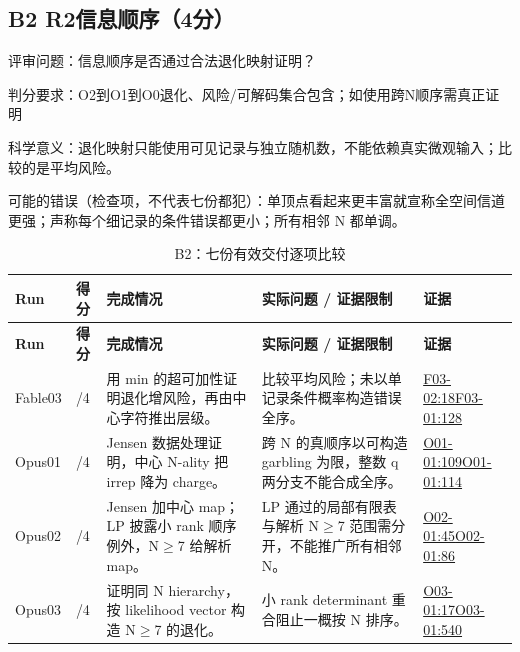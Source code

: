 \documentclass[11pt,a4paper]{article}
\begin{document}
\subsection{B2 R2信息顺序（4分）}
\label{aspect:B2}
评审问题：信息顺序是否通过合法退化映射证明？

判分要求：O2到O1到O0退化、风险/可解码集合包含；如使用跨N顺序需真正证明

科学意义：退化映射只能使用可见记录与独立随机数，不能依赖真实微观输入；比较的是平均风险。

可能的错误（检查项，不代表七份都犯）：单顶点看起来更丰富就宣称全空间信道更强；声称每个细记录的条件错误都更小；所有相邻 N 都单调。

{\fontsize{9.0}{12.6}\selectfont
\setlength{\tabcolsep}{2.5pt}
\begin{longtable}{>{\raggedright\arraybackslash}p{}>{\raggedright\arraybackslash}p{}>{\raggedright\arraybackslash}p{}>{\raggedright\arraybackslash}p{}>{\raggedright\arraybackslash}p{}}
\caption{B2：七份有效交付逐项比较}\\
\toprule
\textbf{Run} & \textbf{得分} & \textbf{完成情况} & \textbf{实际问题 / 证据限制} & \textbf{证据}\tabularnewline
\midrule
\endfirsthead
\toprule
\textbf{Run} & \textbf{得分} & \textbf{完成情况} & \textbf{实际问题 / 证据限制} & \textbf{证据}\tabularnewline
\midrule
\endhead
{}Fable03 & 4/4 & 用 min 的超可加性证明退化增风险，再由中心字符推出层级。 & 比较平均风险；未以单记录条件概率构造错误全序。 & \hyperref[src:F03-02]{F03-02:18}\newline \hyperref[src:F03-01]{F03-01:128}\tabularnewline
{}Opus01 & 4/4 & Jensen 数据处理证明，中心 N-ality 把 irrep 降为 charge。 & 跨 N 的真顺序以可构造 garbling 为限，整数 q 两分支不能合成全序。 & \hyperref[src:O01-01]{O01-01:109}\newline \hyperref[src:O01-01]{O01-01:114}\tabularnewline
{}Opus02 & 4/4 & Jensen 加中心 map；LP 披露小 rank 顺序例外，N\ensuremath{\geq}7 给解析 map。 & LP 通过的局部有限表与解析 N\ensuremath{\geq}7 范围需分开，不能推广所有相邻 N。 & \hyperref[src:O02-01]{O02-01:45}\newline \hyperref[src:O02-01]{O02-01:86}\tabularnewline
{}Opus03 & 4/4 & 证明同 N hierarchy，按 likelihood vector 构造 N\ensuremath{\geq}7 的退化。 & 小 rank determinant 重合阻止一概按 N 排序。 & \hyperref[src:O03-01]{O03-01:17}\newline \hyperref[src:O03-01]{O03-01:540}\tabularnewline

\end{longtable}}
\end{document}
